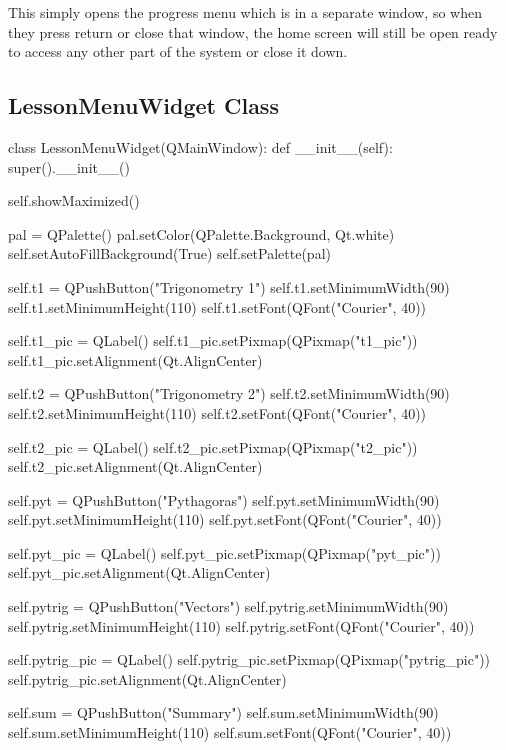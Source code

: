 This simply opens the progress menu which is in a separate window, so when they press return or close that window, the home screen will still be open ready to access any other part of the system or close it down.

\subsection{LessonMenuWidget Class}

\begin{python}
class LessonMenuWidget(QMainWindow):
    def __init__(self):
        super().__init__()

        self.showMaximized()

        pal = QPalette()
        pal.setColor(QPalette.Background, Qt.white)
        self.setAutoFillBackground(True)
        self.setPalette(pal)

        self.t1 = QPushButton("Trigonometry 1")
        self.t1.setMinimumWidth(90)
        self.t1.setMinimumHeight(110)
        self.t1.setFont(QFont("Courier", 40))
        
        self.t1_pic = QLabel()
        self.t1_pic.setPixmap(QPixmap("t1_pic"))
        self.t1_pic.setAlignment(Qt.AlignCenter)
        
        self.t2 = QPushButton("Trigonometry 2")
        self.t2.setMinimumWidth(90)
        self.t2.setMinimumHeight(110)
        self.t2.setFont(QFont("Courier", 40))
        
        self.t2_pic = QLabel()
        self.t2_pic.setPixmap(QPixmap("t2_pic"))
        self.t2_pic.setAlignment(Qt.AlignCenter)
        
        self.pyt = QPushButton("Pythagoras")
        self.pyt.setMinimumWidth(90)
        self.pyt.setMinimumHeight(110)
        self.pyt.setFont(QFont("Courier", 40))
        
        self.pyt_pic = QLabel()
        self.pyt_pic.setPixmap(QPixmap("pyt_pic"))
        self.pyt_pic.setAlignment(Qt.AlignCenter)
        
        self.pytrig = QPushButton("Vectors")
        self.pytrig.setMinimumWidth(90)
        self.pytrig.setMinimumHeight(110)
        self.pytrig.setFont(QFont("Courier", 40))
        
        self.pytrig_pic = QLabel()
        self.pytrig_pic.setPixmap(QPixmap("pytrig_pic"))
        self.pytrig_pic.setAlignment(Qt.AlignCenter)
        
        self.sum = QPushButton("Summary")
        self.sum.setMinimumWidth(90)
        self.sum.setMinimumHeight(110)
        self.sum.setFont(QFont("Courier", 40))
        

\end{python}
